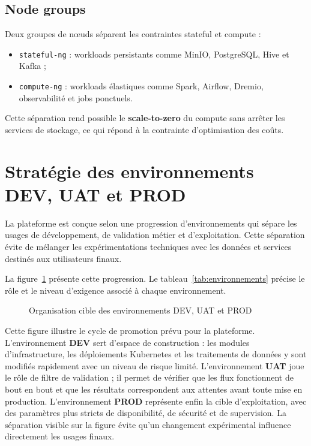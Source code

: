 \subsection{Node groups}

Deux groupes de nœuds séparent les contraintes stateful et compute :
\begin{itemize}
    \item \texttt{stateful-ng} : workloads persistants comme MinIO, PostgreSQL, Hive et Kafka ;
    \item \texttt{compute-ng} : workloads élastiques comme Spark, Airflow, Dremio, observabilité et jobs ponctuels.
\end{itemize}

Cette séparation rend possible le \textbf{scale-to-zero} du compute sans arrêter les services de stockage, ce qui répond à la contrainte d'optimisation des coûts.

\section{Stratégie des environnements DEV, UAT et PROD}

La plateforme est conçue selon une progression d'environnements qui sépare les usages de développement, de validation métier et d'exploitation. Cette séparation évite de mélanger les expérimentations techniques avec les données et services destinés aux utilisateurs finaux.

La figure~\ref{fig:environments-dev-uat-prod} présente cette progression. Le tableau~\ref{tab:environnements} précise le rôle et le niveau d'exigence associé à chaque environnement.

\begin{figure}[H]
\centering
{}
\caption{Organisation cible des environnements DEV, UAT et PROD}
\label{fig:environments-dev-uat-prod}
\end{figure}

Cette figure illustre le cycle de promotion prévu pour la plateforme. L'environnement \textbf{DEV} sert d'espace de construction : les modules d'infrastructure, les déploiements Kubernetes et les traitements de données y sont modifiés rapidement avec un niveau de risque limité. L'environnement \textbf{UAT} joue le rôle de filtre de validation ; il permet de vérifier que les flux fonctionnent de bout en bout et que les résultats correspondent aux attentes avant toute mise en production. L'environnement \textbf{PROD} représente enfin la cible d'exploitation, avec des paramètres plus stricts de disponibilité, de sécurité et de supervision. La séparation visible sur la figure évite qu'un changement expérimental influence directement les usages finaux.

